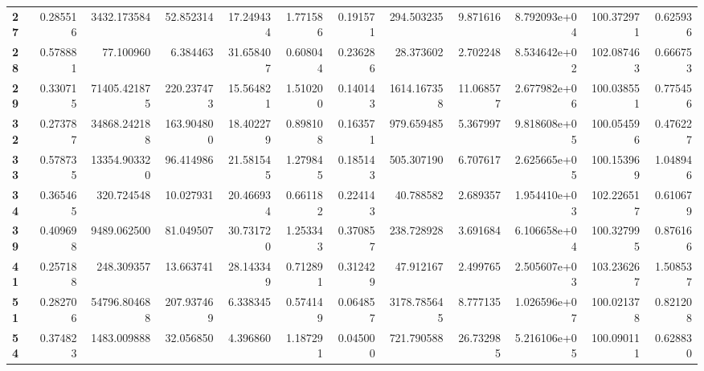 \begin{table}[h]
\begin{tabular}{lrrrrrrrrrrr}
\textbf{27} &  0.285516 &    3432.173584 &       52.852314 &                  17.249434 &  1.771586 &  0.191571 &   294.503235 &   9.871616 &  8.792093e+04 &  100.372971 &     0.625936 \\
\textbf{28} &  0.578881 &      77.100960 &        6.384463 &                  31.658407 &  0.608044 &  0.236286 &    28.373602 &   2.702248 &  8.534642e+02 &  102.087463 &     0.666753 \\
\textbf{29} &  0.330715 &   71405.421875 &      220.237473 &                  15.564821 &  1.510200 &  0.140143 &  1614.167358 &  11.068577 &  2.677982e+06 &  100.038551 &     0.775456 \\
\textbf{32} &  0.273787 &   34868.242188 &      163.904800 &                  18.402279 &  0.898108 &  0.163571 &   979.659485 &   5.367997 &  9.818608e+05 &  100.054596 &     0.476227 \\
\textbf{33} &  0.578735 &   13354.903320 &       96.414986 &                  21.581545 &  1.279845 &  0.185143 &   505.307190 &   6.707617 &  2.625665e+05 &  100.153969 &     1.048946 \\
\textbf{34} &  0.365465 &     320.724548 &       10.027931 &                  20.466934 &  0.661182 &  0.224143 &    40.788582 &   2.689357 &  1.954410e+03 &  102.226517 &     0.610679 \\
\textbf{39} &  0.409698 &    9489.062500 &       81.049507 &                  30.731720 &  1.253343 &  0.370857 &   238.728928 &   3.691684 &  6.106658e+04 &  100.327995 &     0.876166 \\
\textbf{41} &  0.257188 &     248.309357 &       13.663741 &                  28.143349 &  0.712891 &  0.312429 &    47.912167 &   2.499765 &  2.505607e+03 &  103.236267 &     1.508537 \\
\textbf{51} &  0.282706 &   54796.804688 &      207.937469 &                   6.338345 &  0.574149 &  0.064857 &  3178.785645 &   8.777135 &  1.026596e+07 &  100.021378 &     0.821208 \\
\textbf{54} &  0.374823 &    1483.009888 &       32.056850 &                   4.396860 &  1.187291 &  0.045000 &   721.790588 &  26.732985 &  5.216106e+05 &  100.090111 &     0.628830 \\
\bottomrule
\end{tabular}
\end{table}
